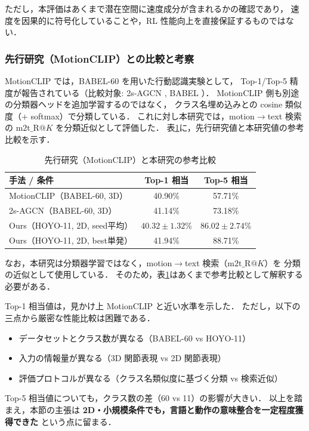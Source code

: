 ただし，本評価はあくまで潜在空間に速度成分が含まれるかの確認であり，
速度を因果的に符号化していることや，RL 性能向上を直接保証するものではない．

\subsubsection{先行研究（MotionCLIP）との比較と考察}
\label{subsubsec:contrastive_prior_comparison}

MotionCLIP \cite{MotionCLIP} では，BABEL-60 を用いた行動認識実験として，
Top-1/Top-5 精度が報告されている（比較対象: 2s-AGCN \cite{agcn2s}, BABEL \cite{babel}）．
MotionCLIP 側も別途の分類器ヘッドを追加学習するのではなく，
クラス名埋め込みとの cosine 類似度（+ softmax）で分類している．
これに対し本研究では，motion$\rightarrow$text 検索の
$\mathrm{m2t\_R@}K$ を分類近似として評価した．
表\ref{tab:motionclip_comparison}に，先行研究値と本研究値の参考比較を示す．

\begin{table}[H]
  \centering
  \caption{先行研究（MotionCLIP）と本研究の参考比較}
  \label{tab:motionclip_comparison}
  \begin{tabular}{lcc} \toprule
    \textbf{手法 / 条件} & \textbf{Top-1 相当} & \textbf{Top-5 相当} \\ \midrule
    MotionCLIP（BABEL-60, 3D）              & 40.90\%               & 57.71\%               \\
    2s-AGCN（BABEL-60, 3D）                & 41.14\%               & 73.18\%               \\
    Ours（HOYO-11, 2D, seed平均）          & $40.32 \pm 1.32$\%    & $86.02 \pm 2.74$\%    \\
    Ours（HOYO-11, 2D, best単発）          & 41.94\%               & 88.71\%               \\ \bottomrule
  \end{tabular}
\end{table}

なお，本研究は分類器学習ではなく，motion$\rightarrow$text 検索（$\mathrm{m2t\_R@}K$）を
分類の近似として使用している．
そのため，表\ref{tab:motionclip_comparison}はあくまで参考比較として解釈する必要がある．

Top-1 相当値は，見かけ上 MotionCLIP と近い水準を示した．
ただし，以下の三点から厳密な性能比較は困難である．
%
\begin{itemize}
  \item データセットとクラス数が異なる（BABEL-60 vs HOYO-11）
  \item 入力の情報量が異なる（3D 関節表現 vs 2D 関節表現）
  \item 評価プロトコルが異なる（クラス名類似度に基づく分類 vs 検索近似）
\end{itemize}
%
Top-5 相当値についても，クラス数の差（60 vs 11）の影響が大きい．
以上を踏まえ，本節の主張は
\textbf{2D・小規模条件でも，言語と動作の意味整合を一定程度獲得できた}
という点に留まる．


